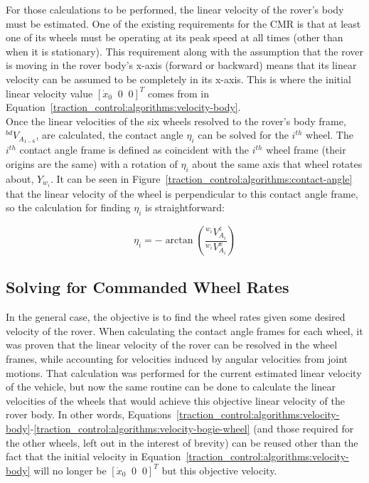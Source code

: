 For those calculations to be performed, the linear velocity of the rover's body must be estimated. One of the existing requirements for the \ac{CMR} is that at least one of its wheels must be operating at its peak speed at all times (other than when it is stationary). This requirement along with the assumption that the rover is moving in the rover body's x-axis (forward or backward) means that its linear velocity can be assumed to be completely in its x-axis. This is where the initial linear velocity value $\left[\dot{x}_0 \;\; 0 \;\; 0\right]^{T}$ comes from in Equation~\ref{traction_control:algorithms:velocity-body}. \\

Once the linear velocities of the six wheels resolved to the rover's body frame, ${}^{bd}V_{A_{1-6}}$, are calculated, the contact angle $\eta_{i}$ can be solved for the $i^{th}$ wheel. The $i^{th}$ contact angle frame is defined as coincident with the $i^{th}$ wheel frame (their origins are the same) with a rotation of $\eta_{i}$ about the same axis that wheel rotates about, $Y_{w_{i}}$. It can be seen in Figure~\ref{traction_control:algorithms:contact-angle} that the linear velocity of the wheel is perpendicular to this contact angle frame, so the calculation for finding $\eta_{i}$ is straightforward:

\begin{equation}\label{traction_control:algorithms:contact-angle-i}
	\eta_{i} = -\arctan\left(\frac{{}^{w_{i}}V^{z}_{A_{i}}}{{}^{w_{i}}V^{x}_{A_{i}}}\right)
\end{equation}

\subsection{Solving for Commanded Wheel Rates}\label{traction_control:algorithms:solving-wheel-rates}
In the general case, the objective is to find the wheel rates given some desired velocity of the rover. When calculating the contact angle frames for each wheel, it was proven that the linear velocity of the rover can be resolved in the wheel frames, while accounting for velocities induced by angular velocities from joint motions. That calculation was performed for the current estimated linear velocity of the vehicle, but now the same routine can be done to calculate the linear velocities of the wheels that would achieve this objective linear velocity of the rover body. In other words, Equations~\ref{traction_control:algorithms:velocity-body}-\ref{traction_control:algorithms:velocity-bogie-wheel} (and those required for the other wheels, left out in the interest of brevity) can be reused other than the fact that the initial velocity in Equation~\ref{traction_control:algorithms:velocity-body} will no longer be $\left[\dot{x}_0 \;\; 0 \;\; 0\right]^{T}$ but this objective velocity. \\

